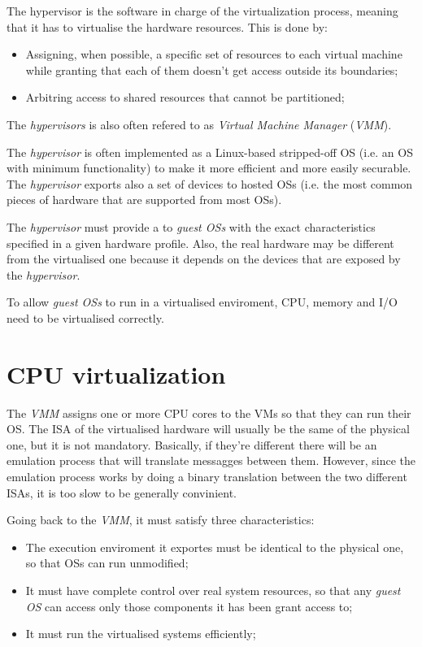 \begin{definition}[Hypervisor]
    The hypervisor is the software in charge of the virtualization process,
    meaning that it has to virtualise the hardware resources. This is done by:
    \begin{itemize}
        \item Assigning, when possible, a specific set of resources to each
        virtual machine while granting that each of them doesn't get access
        outside its boundaries;
        \item Arbitring access to shared resources that cannot be partitioned;
    \end{itemize}
\end{definition}
\begin{note}
    The \emph{hypervisors} is also often refered to as \emph{Virtual Machine
    Manager} (\emph{VMM}).
\end{note}
\noindent
The \emph{hypervisor} is often implemented as a Linux-based stripped-off OS
(i.e. an OS with minimum functionality) to make it more efficient
and more easily securable. The \emph{hypervisor} exports also a set of
 devices to hosted OSs (i.e. the most common pieces of hardware
that are supported from most OSs).

The \emph{hypervisor} must provide a  to \emph{guest
OSs} with the exact characteristics specified in a given hardware profile.
Also, the real hardware may be different from the virtualised one because it
depends on the devices that are exposed by the \emph{hypervisor}.

To allow \emph{guest OSs} to run in a virtualised enviroment, CPU, memory and
I/O need to be virtualised correctly.

\section{CPU virtualization}
The \emph{VMM} assigns one or more CPU cores to the VMs so that they can run
their OS. The ISA of the virtualised hardware will usually be the same
of the physical one, but it is not mandatory. Basically, if they're different
there will be an emulation process that will translate messagges between them.
However, since the emulation process works by doing a binary translation between
the two different ISAs, it is too slow to be generally convinient.

Going back to the \emph{VMM}, it must satisfy three characteristics:
\begin{itemize}
    \item The execution enviroment it exportes must be identical to the
    physical one, so that OSs can run unmodified;
    \item It must have complete control over real system resources, so that
    any \emph{guest OS} can access only those components it has been grant access
    to;
    \item It must run the virtualised systems efficiently;
\end{itemize}

